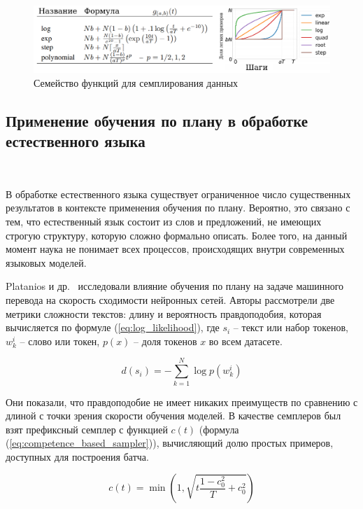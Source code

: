 \documentclass{spbau-diploma}
\begin{document}
\begin{figure}[h]
	\centering
	\includegraphics[scale=0.48]{CV_pacing_functions}
	\caption{Семейство функций для семплирования данных}
	\label{fig:cv_pacing_functions}
\end{figure}

\subsection{Применение обучения по плану в обработке естественного языка}
\ 

В обработке естественного языка существует ограниченное число существенных результатов в контексте применения обучения по плану. Вероятно, это связано с тем, что естественный язык состоит из слов и предложений, не имеющих строгую структуру, которую сложно формально описать. Более того, на данный момент наука не понимает всех процессов, происходящих внутри современных языковых моделей.

Platanios и др.~\cite{platanios2019competence} исследовали влияние обучения по плану на задаче машинного перевода на скорость сходимости нейронных сетей. Авторы рассмотрели две метрики сложности текстов: длину и вероятность правдоподобия, которая вычисляется по формуле (\ref{eq:log_likelihood}), где $s_i$ -- текст или набор токенов, $w_k^i$ -- слово или токен, $p(x)$ -- доля токенов $x$ во всем датасете.

\begin{equation} \label{eq:log_likelihood}
d(s_i) = -\sum\limits_{k=1}^{N}\log p(w_k^i)
\end{equation}

Они показали, что правдоподобие не имеет никаких преимуществ по сравнению  с длиной с точки зрения скорости обучения моделей. В качестве семплеров был взят префиксный семплер с функцией $c(t)$ (формула (\ref{eq:competence_based_sampler})), вычисляющий долю простых примеров, доступных для построения батча.

\begin{equation} \label{eq:competence_based_sampler}
c(t) = \min\left(1, \sqrt{t\frac{1 - c_0^2}{T} + c_0^2}\right)
\end{equation}
\end{document}
